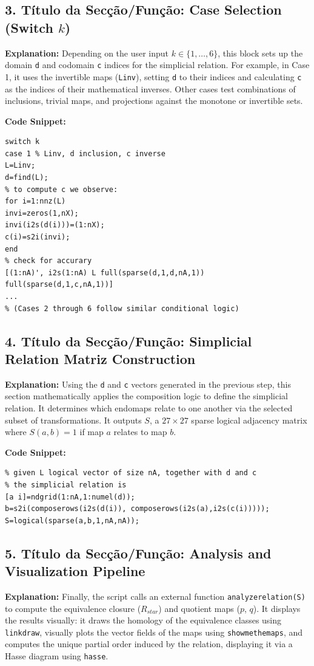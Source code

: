 \subsection{3. Título da Secção/Função: Case Selection (Switch $k$)}
\textbf{Explanation:} 
Depending on the user input $k \in \{1, \dots, 6\}$, this block sets up the domain \texttt{d} and codomain \texttt{c} indices for the simplicial relation. For example, in Case 1, it uses the invertible maps (\texttt{Linv}), setting \texttt{d} to their indices and calculating \texttt{c} as the indices of their mathematical inverses. Other cases test combinations of inclusions, trivial maps, and projections against the monotone or invertible sets.

\textbf{Code Snippet:}
\begin{lstlisting}
switch k
case 1 % Linv, d inclusion, c inverse
L=Linv;
d=find(L);
% to compute c we observe:
for i=1:nnz(L)
invi=zeros(1,nX);
invi(i2s(d(i)))=(1:nX);
c(i)=s2i(invi);
end
% check for accurary
[(1:nA)', i2s(1:nA) L full(sparse(d,1,d,nA,1)) full(sparse(d,1,c,nA,1))]
...
% (Cases 2 through 6 follow similar conditional logic)
\end{lstlisting}

\subsection{4. Título da Secção/Função: Simplicial Relation Matriz Construction}
\textbf{Explanation:} 
Using the \texttt{d} and \texttt{c} vectors generated in the previous step, this section mathematically applies the composition logic to define the simplicial relation. It determines which endomaps relate to one another via the selected subset of transformations. It outputs $S$, a $27 \times 27$ sparse logical adjacency matrix where $S(a,b) = 1$ if map $a$ relates to map $b$. 

\textbf{Code Snippet:}
\begin{lstlisting}
% given L logical vector of size nA, together with d and c
% the simplicial relation is
[a i]=ndgrid(1:nA,1:numel(d));
b=s2i(composerows(i2s(d(i)), composerows(i2s(a),i2s(c(i)))));
S=logical(sparse(a,b,1,nA,nA));
\end{lstlisting}

\subsection{5. Título da Secção/Função: Analysis and Visualization Pipeline}
\textbf{Explanation:} 
Finally, the script calls an external function \texttt{analyzerelation(S)} to compute the equivalence closure ($R_{star}$) and quotient maps ($p$, $q$). It displays the results visually: it draws the homology of the equivalence classes using \texttt{linkdraw}, visually plots the vector fields of the maps using \texttt{showmethemaps}, and computes the unique partial order induced by the relation, displaying it via a Hasse diagram using \texttt{hasse}.

